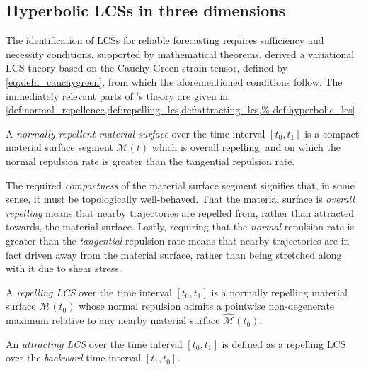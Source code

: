 \subsection{Hyperbolic LCSs in three dimensions}
\label{sub:hyperbolic_lcss_in_three_dimensions}

The identification of LCSs for reliable forecasting requires sufficiency and
necessity conditions, supported by mathematical theorems.
\textcite{haller2011variational} derived a variational LCS theory based on
the Cauchy-Green strain tensor, defined by \cref{eq:defn_cauchygreen}, from
which the aforementioned conditions follow. The immediately relevant parts
of \citeauthor{haller2011variational}'s theory are given in
\cref{def:normal_repellence,def:repelling_lcs,def:attracting_lcs,%
def:hyperbolic_lcs} \parencite{haller2011variational}.

\begin{defn}
    \label{def:normal_repellence}
    A \emph{normally repellent material surface} over the time interval
    $[t_{0},t_{1}]$ is a compact material surface segment $\mathcal{M}(t)$
    which is overall repelling, and on which the normal repulsion rate is
    greater than the tangential repulsion rate.
\end{defn}

The required \emph{compactness} of the material surface segment signifies that,
in some sense, it must be topologically well-behaved. That the material surface
is \emph{overall repelling} means that nearby trajectories are repelled from,
rather than attracted towards, the material surface. Lastly, requiring that the
\emph{normal} repulsion rate is greater than the \emph{tangential} repulsion
rate means that nearby trajectories are in fact driven away from the material
surface, rather than being stretched along with it due to shear stress.

\begin{defn}
    \label{def:repelling_lcs}
    A \emph{repelling LCS} over the time interval $[t_{0},t_{1}]$ is a
    normally repelling material surface $\mathcal{M}(t_{0})$ whose normal
    repulsion admits a pointwise non-degenerate maximum relative to any nearby
    material surface $\widehat{\mathcal{M}}(t_{0})$.
\end{defn}

\begin{defn}
    \label{def:attracting_lcs}
    An \emph{attracting LCS} over the time interval $[t_{0},t_{1}]$ is defined
    as a repelling LCS over the \emph{backward} time interval $[t_{1},t_{0}]$.
\end{defn}

